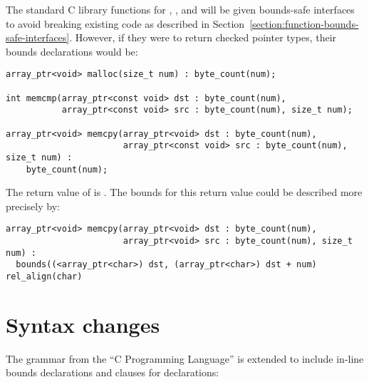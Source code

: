 The standard C library functions for , , and
 will be
given bounds-safe interfaces to avoid breaking existing code as
described in Section~\ref{section:function-bounds-safe-interfaces}.
However, if they were to return checked pointer
types, their bounds declarations would be:

\begin{lstlisting}
array_ptr<void> malloc(size_t num) : byte_count(num);

int memcmp(array_ptr<const void> dst : byte_count(num),
           array_ptr<const void> src : byte_count(num), size_t num);

array_ptr<void> memcpy(array_ptr<void> dst : byte_count(num),
                       array_ptr<const void> src : byte_count(num), size_t num) :
    byte_count(num);
\end{lstlisting}

The return value of  is . The bounds for
this return value could be described more precisely by:

\begin{lstlisting}
array_ptr<void> memcpy(array_ptr<void> dst : byte_count(num),
                       array_ptr<void> src : byte_count(num), size_t num) :
  bounds((<array_ptr<char>) dst, (array_ptr<char>) dst + num) rel_align(char)
\end{lstlisting}
\section{Syntax changes}
The grammar from the ``C Programming Language'' \cite{Ritchie1988} is extended to include
in-line bounds declarations and  clauses for declarations:


